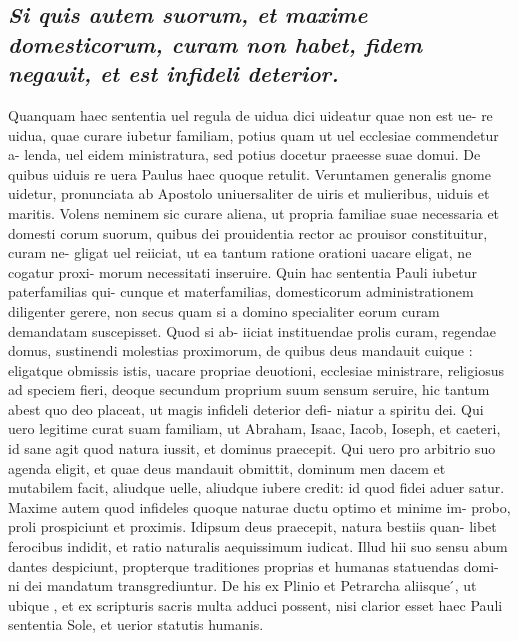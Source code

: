 \documentclass{article}
\begin{document}
\begin{pages}
\subsection*{\textit{Si quis autem suorum, et maxime domesticorum, curam non habet, fidem negauit, et est infideli deterior. }}\pstart Quanquam haec sententia uel regula de uidua dici uideatur quae non est ue- re uidua, quae curare iubetur familiam, potius quam ut uel ecclesiae commendetur a- lenda, uel eidem ministratura, sed potius docetur praeesse suae domui. De quibus uiduis re uera Paulus haec quoque retulit. Veruntamen generalis gnome uidetur, pronunciata ab Apostolo uniuersaliter de uiris et mulieribus, uiduis et maritis. Volens neminem sic curare aliena, ut propria familiae suae necessaria et domesti corum suorum, quibus dei prouidentia rector ac prouisor constituitur, curam ne- gligat uel reiiciat, ut ea tantum ratione orationi uacare eligat, ne cogatur proxi- morum necessitati inseruire. Quin hac sententia Pauli iubetur paterfamilias qui- cunque et materfamilias, domesticorum administrationem diligenter gerere, non secus quam si a domino specialiter eorum curam demandatam suscepisset. Quod si ab- iiciat instituendae prolis curam, regendae domus, sustinendi molestias proximorum, de quibus deus mandauit cuique : eligatque obmissis istis, uacare propriae deuotioni, ecclesiae ministrare, religiosus ad speciem fieri, deoque secundum proprium suum sensum seruire, hic tantum abest quo deo placeat, ut magis infideli deterior defi- niatur a spiritu dei. Qui uero legitime curat suam familiam, ut Abraham, Isaac, Iacob, Ioseph, et caeteri, id sane agit quod natura iussit, et dominus praecepit. Qui uero pro arbitrio suo agenda eligit, et quae deus mandauit obmittit, dominum men dacem et mutabilem facit, aliudque uelle, aliudque iubere credit: id quod fidei aduer satur. Maxime autem quod infideles quoque naturae ductu optimo et minime im- probo, proli prospiciunt et proximis. Idipsum deus praecepit, natura bestiis quan- libet ferocibus indidit, et ratio naturalis aequissimum iudicat. Illud hii suo sensu abum dantes despiciunt, propterque traditiones proprias et humanas statuendas domi- ni dei mandatum transgrediuntur. De his ex Plinio et Petrarcha aliisque ́, ut ubique , et ex scripturis sacris multa adduci possent, nisi clarior esset haec Pauli sententia Sole, et uerior statutis humanis.  \pend
{}
{}

\end{pages}
\end{document}

